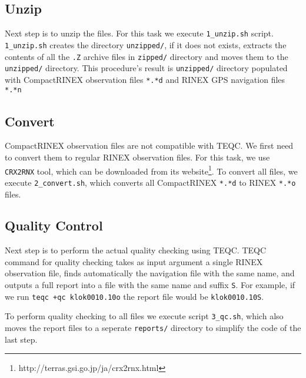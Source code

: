 \documentclass[
12pt, %
a4paper, %
oneside, %
headinclude,footinclude, %
BCOR5mm, %
]{article}
\begin{document}
\subsection{Unzip}
Next step is to unzip the files. For this task we execute \texttt{1\_unzip.sh} script. \texttt{1\_unzip.sh} creates the directory \texttt{unzipped/}, if it does not exists, extracts the contents of all the \texttt{.Z} archive files in \texttt{zipped/} directory and moves them to the \texttt{unzipped/} directory. This procedure's result is \texttt{unzipped/} directory populated with CompactRINEX observation files \texttt{*.*d} and RINEX GPS navigation files \texttt{*.*n}

\vspace*{25pt}


\subsection{Convert}

CompactRINEX observation files are not compatible with TEQC. We first need to convert them to regular RINEX observation files. For this task, we use \texttt{CRX2RNX} tool, which can be downloaded from its website\footnote{http://terras.gsi.go.jp/ja/crx2rnx.html}. To convert all files, we execute \texttt{2\_convert.sh}, which converts all CompactRINEX \texttt{*.*d} to RINEX \texttt{*.*o} files.

\vspace*{25pt}


\subsection{Quality Control}
Next step is to perform the actual quality checking using TEQC. TEQC command for quality checking takes as input argument a single RINEX observation file, finds automatically the navigation file with the same name, and outputs a full report into a file with the same name and suffix \texttt{S}. For example, if we run \texttt{teqc +qc klok0010.10o} the report file would be  \texttt{klok0010.10S}. 

To  perform quality checking to all files we execute script \texttt{3\_qc.sh}, which also moves the report files to a seperate \texttt{reports/} directory to simplify the code of the last step.
\end{document}
